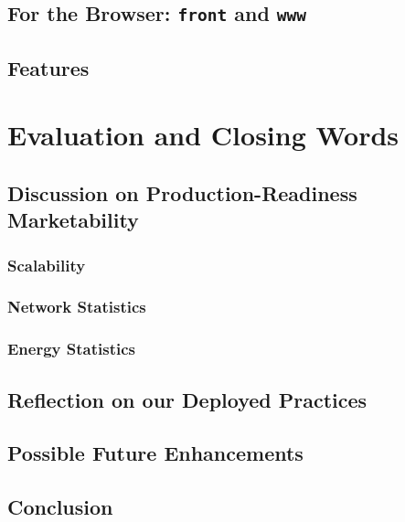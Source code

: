 \documentclass[acmtog, language=english, nonacm]{acmart}
\begin{document}
    \subsection{For the Browser: \texttt{front} and \texttt{www}}

    \subsection{Features}

    \section{Evaluation and Closing Words}

    \subsection{Discussion on Production-Readiness Marketability}

    \subsubsection{Scalability}

    \subsubsection{Network Statistics}

    \subsubsection{Energy Statistics}

    \subsection{Reflection on our Deployed Practices}

    \subsection{Possible Future Enhancements}

    \subsection{Conclusion}

    
    

\end{document}
